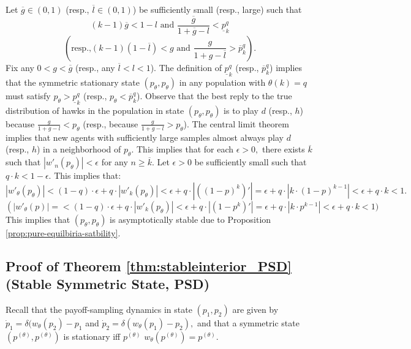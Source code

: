 \documentclass[12pt]{article}
\numberwithin{equation}{section}
\numberwithin{figure}{section}
\theoremstyle{definition}
\theoremstyle{plain}
\theoremstyle{plain}
\theoremstyle{plain}
\theoremstyle{remark}
\theoremstyle{plain}
\theoremstyle{plain}
\begin{document}
Let $\overline{g}\in(0,1)$ (resp., $\overline{l}\in(0,1)$) be sufficiently small (resp., large) such that  $$(k-1)\overline{g}<1-l \textrm{ and } \frac{\overline{g}}{1+\overline{g}-l}<\underline{p}_k^q$$ $$(\textrm{resp.,} (k-1)(1-\overline{l})<g \textrm{ and }  \frac{g}{1+g-\overline{l}}>\overline{p}_k^q).$$  Fix any $0<g<\overline{g}$ (resp., any $\overline{l}<l<1$). The definition of $\underline{p}_k^q$ (resp.,  $\overline{p}_k^q$) implies that the symmetric stationary state $(p_\theta,p_\theta)$ in any population with $\theta(k)=q$ must satisfy $p_\theta>\underline{p}_k^q$ (resp., $p_\theta<\overline{p}_k^q$). Observe that the best reply to the true distribution of hawks in the population in state $(p_\theta,p_\theta)$
is to play $d$ (resp., $h$) because $\frac{g}{1+g-l}<p_\theta$ (resp., because $\frac{g}{1+g-l}>p_\theta$). The central limit theorem implies that new agents with sufficiently large samples almost always play $d$ (resp., $h$) in a neighborhood of $p_\theta.$ This implies that for each $\epsilon>0,$ there exists $\overline{k}$ such that $|w'_n(p_\theta)|<\epsilon$ for any $n\geq\overline{k}$. 
Let $\epsilon>0$ be sufficiently small such that $q\cdot k<1-\epsilon$.  This implies that:
$$|w'_\theta(p_\theta)|<(1-q)\cdot\epsilon+q\cdot|w'_k(p_\theta)|<\epsilon+q\cdot|((1-p)^k)'|=\epsilon+q\cdot|k\cdot(1-p)^{k-1}|<\epsilon+q\cdot k<1.$$
$$\left(|w'_\theta(p)|=<(1-q)\cdot\epsilon+q\cdot|w'_k(p_\theta)|<\epsilon+q\cdot|(1-p^k)'|=\epsilon+q\cdot|k\cdot{p}^{k-1}|<\epsilon+q\cdot k<1\right.)$$ This implies that $(p_\theta,p_\theta)$ is asymptotically stable due to  Proposition \ref{prop:pure-equilbiria-satbility}.   
\subsection{Proof of Theorem \ref{thm:stableinterior_PSD} (Stable Symmetric State, PSD)}\label{subsec:stableinterior_PSDproof}
Recall that the payoff-sampling dynamics in state $(p_1,p_2)$ are given by
$\dot{p}_1 = \delta(w_\theta(p_2) - p_1$ and $\dot{p}_2  = \delta(w_\theta(p_1) - p_2),$
and that a symmetric state $(p^{(\theta)},p^{(\theta)})$ is  stationary iff $p^{(\theta)}$ $w_\theta (p^{(\theta)})=p^{(\theta)}$. 
\end{document}
